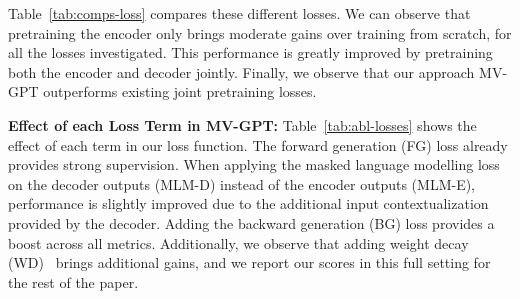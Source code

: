 \documentclass[10pt,twocolumn,letterpaper]{article}
\begin{document}
Table~\ref{tab:comps-loss} compares these different losses. We can observe that  pretraining the encoder only brings moderate gains over training from scratch, for all the losses investigated.
This performance is greatly improved by pretraining both the encoder and decoder jointly. Finally, we observe that our approach MV-GPT outperforms existing joint pretraining losses. 






\begin{table}[t]
    \centering
    \caption{Ablation on YouCook2 showing the effect of our different loss components in pretraining. \textbf{FG:} Forward Generation loss. \textbf{BG:} Backward Generation loss. \textbf{MLM-E/MLM-D:} Masked Language Modelling loss applied on encoder outputs (E) or decoder outputs (D). \textbf{WD:} Weight Decay. \textbf{No PT:} No pretraining with any of these losses.
    } 
    \label{tab:abl-losses}
\end{table}
\noindent\textbf{Effect of each Loss Term in MV-GPT:}
Table~\ref{tab:abl-losses} shows the effect of each term in our loss function. 
The forward generation (FG) loss already provides strong supervision.
When applying the masked language modelling loss on the decoder outputs (MLM-D) instead of the encoder outputs (MLM-E), performance is slightly improved due to the additional input contextualization provided by the decoder.
Adding the backward generation (BG) loss provides a boost across all metrics.  
Additionally, we observe that adding weight decay (WD)~\cite{krogh1992simple} brings additional gains, and we report our scores in this full setting for the rest of the paper.
\end{document}
